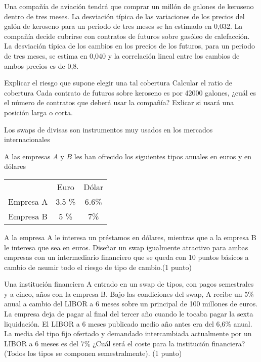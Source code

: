 \begin{problem}[4]
Una compañía de aviación tendrá que comprar un millón de galones de keroseno dentro de tres
meses. La desviación típica de las variaciones de los precios del galón de keroseno para un periodo
de tres meses se ha estimado en 0,032. La compañía decide cubrirse con contratos de futuros sobre
gasóleo de calefacción. La desviación típica de los cambios en los precios de los futuros, para un
periodo de tres meses, se estima en 0,040 y la correlación lineal entre los cambios de ambos precios
es de 0,8.

\ppart Explicar el riesgo que supone elegir una tal cobertura
\ppart Calcular el ratio de cobertura
\ppart Cada contrato de futuros sobre keroseno es por 42000 galones, ¿cuál es el número de contratos que deberá usar la compañía? Exlicar si usará una posición larga o corta.
\solution

\end{problem}

\begin{problem}[5]
Los swaps de divisas son instrumentos muy usados en los mercados internacionales

\ppart A las empresas $A$ y $B$ les han ofrecido los siguientes tipos anuales en euros y en dólares

\begin{center}
\begin{tabular}{ccc}
\hline
& Euro & Dólar \\
Empresa A & 3.5 \% & 6.6\% \\
Empresa B & 5 \% & 7\% \\
\hline
\end{tabular}
\end{center}

A la empresa A le interesa un préstamos en dólares, mientras que a la empresa B le interesa que
sea en euros. Diseñar un swap igualmente atractivo para ambas empresas con un intermediario
financiero que se queda con 10 puntos básicos a cambio de asumir todo el riesgo de tipo de
cambio.(1 punto)

\ppart Una institución financiera A entrado en un swap de tipos, con pagos semestrales y a cinco,
años con la empresa B. Bajo las condiciones del swap, A recibe un 5\% anual a cambio del
LIBOR a 6 meses sobre un principal de 100 millones de euros. La empresa deja de pagar
al final del tercer año cuando le tocaba pagar la sexta liquidación. El LIBOR a 6 meses
publicado medio año antes era del 6,6\% anual. La media del tipo fijo ofertado y demandado
intercambiada actualmente por un LIBOR a 6 meses es del 7\% ¿Cuál será el coste para la
institución financiera? (Todos los tipos se componen semestralmente). (1 punto)

\solution

\end{problem}

